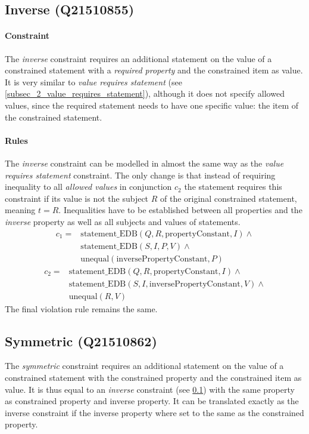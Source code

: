 \documentclass[hyperref,bachelorofscience,fleqn]{cgvpub}
\begin{document}
\subsection{Inverse (Q21510855)}\label{subsec_2_inverse}
\paragraph{Constraint}
The \emph{inverse} constraint requires an additional statement on the value of a constrained statement with a \emph{required property} and the constrained item as value. It is very similar to \emph{value requires statement} (see \ref{subsec_2_value_requires_statement}), although it does not specify allowed values, since the required statement needs to have one specific value: the item of the constrained statement.

\paragraph{Rules}
The \emph{inverse} constraint can be modelled in almost the same way as the \emph{value requires statement} constraint. The only change is that instead of requiring inequality to all \emph{allowed values} in conjunction \(c_2\) the statement requires this constraint if its value is not the subject \(R\) of the original constrained statement, meaning \(t = R\). Inequalities have to be established between all properties and the \emph{inverse} property as well as all subjects and values of statements.
\begin{equation*}
\begin{split}
c_1 = &\text{statement\_EDB}(Q, R, \text{propertyConstant}, I) \wedge{} \\
&\text{statement\_EDB}(S, I, P, V) \wedge{} \\
&\text{unequal}(\text{inversePropertyConstant}, P)
\end{split}
\end{equation*}
\begin{equation*}
\begin{split}
c_2 = &\text{statement\_EDB}(Q, R, \text{propertyConstant}, I) \wedge{} \\
&\text{statement\_EDB}(S, I, \text{inversePropertyConstant}, V) \wedge{} \\
&\text{unequal}(R, V)
\end{split}
\end{equation*}
The final violation rule remains the same.

\subsection{Symmetric (Q21510862)}
The \emph{symmetric} constraint requires an additional statement on the value of a constrained statement with the constrained property and the constrained item as value. It is thus equal to an \emph{inverse} constraint (see \ref{subsec_2_inverse}) with the same property as constrained property and inverse property. It can be translated exactly as the inverse constraint if the inverse property where set to the same as the constrained property.
\end{document}
